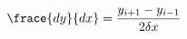 \documentclass[preview]{standalone}
\begin{document}
\begin{align*}
\frace{dy}{dx} = \frac{y_{i+1} - y_{i-1}}{2\delta x}
\end{align*}
\end{document}
